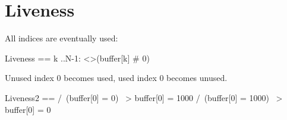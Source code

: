 \section{Liveness}

All indices are eventually used:

\begin{tla}
    Liveness ==
    \A k ..N-1:
    <>(buffer[k] # 0)
\end{tla}
\begin{tlatex}
%
%
%
\end{tlatex}

Unused index 0 becomes used, used index 0 becomes unused.
\begin{tla}
    Liveness2 ==
    /\ (buffer[0] = 0) ~> buffer[0] = 1000
    /\ (buffer[0] = 1000) ~> buffer[0] = 0
\end{tla}
\begin{tlatex}
%
\end{tlatex}

% 